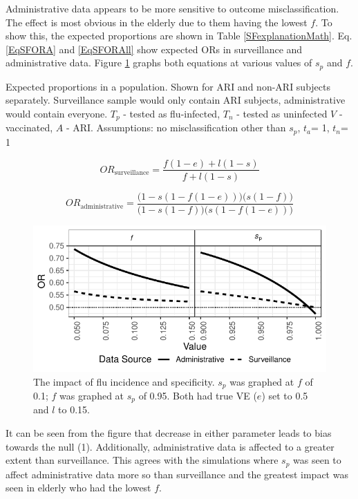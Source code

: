 \documentclass[11pt]{article}
\begin{document}
Administrative data appears to be more sensitive to outcome misclassification. The effect is most obvious in the elderly due to them having the lowest $f$. To show this, the expected proportions are shown in Table \ref{SFexplanationMath}. Eq. \ref{EqSFORA} and \ref{EqSFORAll} show expected ORs in surveillance and administrative data. Figure \ref{SFIPfGraph} graphs both equations at various values of $s_p$ and $f$.

\pagebreak

\begin{table}[h]
\centering
\caption{
Expected proportions in a population. Shown for ARI and non-ARI subjects separately. Surveillance sample would only contain ARI subjects, administrative would contain everyone. $T_p$ - tested as flu-infected, $T_n$ - tested as uninfected $V$ - vaccinated, $A$ - ARI.
Assumptions: no misclassification other than $s_p$, $t_a$= 1, $t_n$= 1
\label{SFexplanationMath} 
}
	
\end{table}

\begin{equation} \label{EqSFORA}
OR_{\text{surveillance}} = \frac{f(1-e)+l(1-s)}{f+l(1-s)}
\end{equation}

\begin{equation} \label{EqSFORAll}
OR_{\text{administrative}} = \frac{\Big(1-s(1-f(1-e))\Big)\Big(s(1-f)\Big)}{\Big(1-s(1-f)\Big)\Big(s(1-f(1-e))\Big)}
\end{equation}

\begin{figure}[h]
	\centering
		\includegraphics[width=0.75\linewidth]{../fig-sfinv/sfinv.pdf}
		\caption{
The impact of flu incidence and specificity. $s_p$ was graphed at $f$ of 0.1; $f$ was graphed at $s_p$ of 0.95. Both had true VE ($e$) set to 0.5 and $l$ to 0.15. \label{SFIPfGraph}
		}
\end{figure}

It can be seen from the figure that  decrease in either parameter leads to bias towards the null (1). Additionally, administrative data is affected to a greater extent than surveillance. This agrees with the simulations where $s_p$ was seen to affect administrative data more so than surveillance and the greatest impact was seen in elderly who had the lowest $f$.
\end{document}
